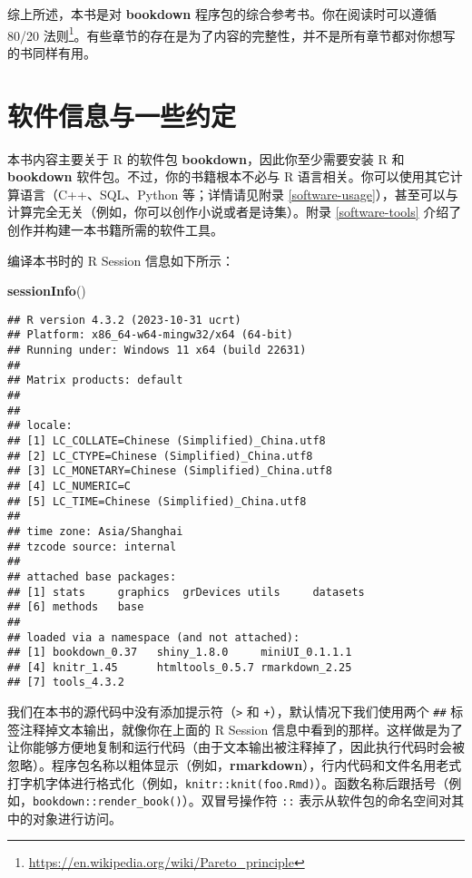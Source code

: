 \documentclass[
  12pt,
]{krantz}
\newenvironment{Shaded}{\begin{snugshade}}{\end{snugshade}}
\newcommand{\FunctionTok}[1]{\textcolor[rgb]{0.13,0.29,0.53}{\textbf{#1}}}
\newcommand{\NormalTok}[1]{#1}
\renewcommand{\href}[2]{#2\footnote{\url{#1}}}
\theoremstyle{definition}
\theoremstyle{definition}
\theoremstyle{definition}
\theoremstyle{definition}
\theoremstyle{remark}
\begin{document}
综上所述，本书是对 \textbf{bookdown} 程序包的综合参考书。你在阅读时可以遵循 \href{https://en.wikipedia.org/wiki/Pareto_principle}{80/20 法则}。有些章节的存在是为了内容的完整性，并不是所有章节都对你想写的书同样有用。

\section*{软件信息与一些约定}\label{ux8f6fux4ef6ux4fe1ux606fux4e0eux4e00ux4e9bux7ea6ux5b9a}


本书内容主要关于 R 的软件包 \textbf{bookdown}，因此你至少需要安装 R 和 \textbf{bookdown} 软件包。不过，你的书籍根本不必与 R 语言相关。你可以使用其它计算语言（C++、SQL、Python 等；详情请见附录 \ref{software-usage}），甚至可以与计算完全无关（例如，你可以创作小说或者是诗集）。附录 \ref{software-tools} 介绍了创作并构建一本书籍所需的软件工具。

编译本书时的 R Session 信息如下所示：

\begin{Shaded}
\begin{Highlighting}[]
\FunctionTok{sessionInfo}\NormalTok{()}
\end{Highlighting}
\end{Shaded}

\begin{verbatim}
## R version 4.3.2 (2023-10-31 ucrt)
## Platform: x86_64-w64-mingw32/x64 (64-bit)
## Running under: Windows 11 x64 (build 22631)
## 
## Matrix products: default
## 
## 
## locale:
## [1] LC_COLLATE=Chinese (Simplified)_China.utf8 
## [2] LC_CTYPE=Chinese (Simplified)_China.utf8   
## [3] LC_MONETARY=Chinese (Simplified)_China.utf8
## [4] LC_NUMERIC=C                               
## [5] LC_TIME=Chinese (Simplified)_China.utf8    
## 
## time zone: Asia/Shanghai
## tzcode source: internal
## 
## attached base packages:
## [1] stats     graphics  grDevices utils     datasets 
## [6] methods   base     
## 
## loaded via a namespace (and not attached):
## [1] bookdown_0.37   shiny_1.8.0     miniUI_0.1.1.1 
## [4] knitr_1.45      htmltools_0.5.7 rmarkdown_2.25 
## [7] tools_4.3.2
\end{verbatim}

我们在本书的源代码中没有添加提示符（\texttt{\textgreater{}} 和 \texttt{+}），默认情况下我们使用两个 \texttt{\#\#} 标签注释掉文本输出，就像你在上面的 R Session 信息中看到的那样。这样做是为了让你能够方便地复制和运行代码（由于文本输出被注释掉了，因此执行代码时会被忽略）。程序包名称以粗体显示（例如，\textbf{rmarkdown}），行内代码和文件名用老式打字机字体进行格式化（例如，\texttt{knitr::knit(\textquotesingle{}foo.Rmd\textquotesingle{})}）。函数名称后跟括号（例如，\texttt{bookdown::render\_book()}）。双冒号操作符 \texttt{::} 表示从软件包的命名空间对其中的对象进行访问。
\end{document}
